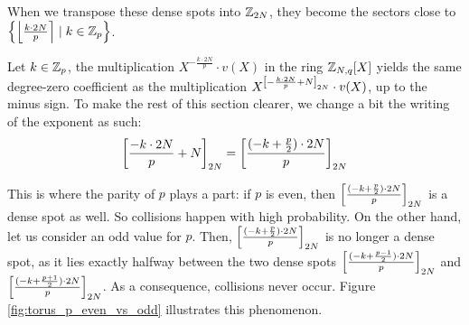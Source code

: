 When we transpose these dense spots into $\mathbb{Z}_{2N}$, they become the sectors close to $\left \{ \left \lfloor \frac{k \cdot 2N}{p} \right \rceil \mid k \in \mathbb{Z}_p \right \}$. 

Let $k \in \mathbb{Z}_p$, the multiplication $X^{- \frac{k \cdot 2N}{p}} \cdot v(X)$ in the ring $\mathbb{Z}_{N,q}[X]$ yields the same degree-zero coefficient as the multiplication  $X^{\left [ - \frac{k \cdot 2N}{p} + N \right ]_{2N}} \cdot v(X)$, up to the minus sign. To make the rest of this section clearer, we change a bit the writing of the exponent as such: 
\[\left [ 
	\frac{
		-k \cdot 2N
	}
	{
		p
	}
	+ N
 \right ]_{2N} = 
\left [ 
	\frac{
		(-k + \frac p 2 ) \cdot 2N
	}
	{p}
 \right ]_{2N}\]


This is where the parity of $p$ plays a part: if $p$ is even, then $\left [ 
	\frac{
		(-k + \frac p 2 ) \cdot 2N
	}
	{p}
 \right ]_{2N}$ is a dense spot as well. So collisions happen with high probability.  On the other hand, let us consider an odd value for $p$. Then, $\left [ 
	\frac{
		(-k + \frac p 2 ) \cdot 2N
	}
	{p}
 \right ]_{2N}$ is no longer a dense spot, as it lies exactly halfway between the two dense spots $\left [ 
	\frac{
		(-k + \frac {p-1} {2} ) \cdot 2N
	}
	{p}
 \right ]_{2N}$ and $\left [ 
	\frac{
		(-k + \frac {p+1} {2} ) \cdot 2N
	}
	{p}
 \right ]_{2N}$. As a consequence, collisions never occur. Figure \ref{fig:torus_p_even_vs_odd} illustrates this phenomenon.


